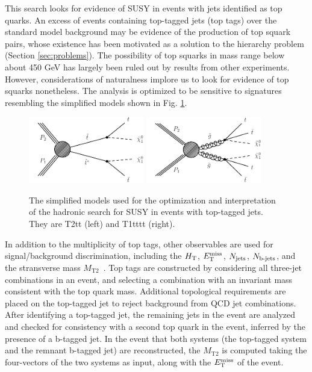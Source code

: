 This search \cite{CMS:2016nhb} looks for evidence of SUSY in events with jets identified as top quarks. An excess of events containing top-tagged jets (top tags) over the standard model background may be evidence of the production of top squark pairs, whose existence has been motivated as a solution to the hierarchy problem (Section \ref{sec:problems}).  The possibility of top squarks in mass range below about 450 GeV has largely been ruled out by results from other experiments.  However, considerations of naturalness implore us to look for evidence of top squarks nonetheless. The analysis is optimized to be sensitive to signatures resembling the simplified models shown in Fig. \ref{fig:hadstopSMS}.
\begin{figure}[h]
\centering
\includegraphics[width=0.45\textwidth]{figures/SusySearches/HadStop2015/T2tt.pdf}
\includegraphics[width=0.45\textwidth]{figures/SusySearches/HadStop2015/T1tttt.pdf}\\
\caption{
  The simplified models used for the optimization and interpretation of the hadronic search for SUSY in events with top-tagged jets. They are T2tt (left) and T1tttt (right).
}
\label{fig:hadstopSMS}
\end{figure}

In addition to the multiplicity of top tags, other observables are used for signal/background discrimination, including the $H_{\rm T}$, $E_{\text{T}}^{\rm miss}$, $N_{\rm jets}$, $N_{\text{b-jets}}$, and the stransverse mass $M_{\text{T2}}$~\cite{Lester:1999tx}. Top tags are constructed by considering all three-jet combinations in an event, and selecting a combination with an invariant mass consistent with the top quark mass. Additional topological requirements are placed on the top-tagged jet to reject background from QCD jet combinations. After identifying a top-tagged jet, the remaining jets in the event are analyzed and checked for consistency with a second top quark in the event, inferred by the presence of a b-tagged jet. In the event that both systems (the top-tagged system and the remnant b-tagged jet) are reconstructed, the $M_{\text{T2}}$ is computed taking the four-vectors of the two systems as input, along with the $E_{\text{T}}^{\rm miss}$ of the event. 

